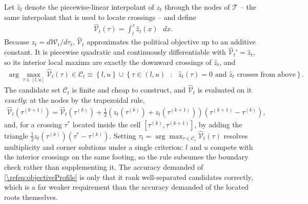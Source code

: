 \documentclass[a4paper]{article}
\begin{document}
Let $\hat{z}_t$ denote the piecewise-linear interpolant of $z_t$ through the nodes of $\mathcal{T}$ -- the same interpolant that is used to locate crossings -- and define
\begin{align}\label{\refeq:objectiveProfile}
    \hat{\mathcal{V}}_t(\tau) = \int_l^{\tau}\hat{z}_t(x)\mbox{ }dx.
\end{align}
Because $z_t = d\mathcal{W}_t/d\tau_t$, $\hat{\mathcal{V}}_t$ approximates the political objective up to an additive constant. It is piecewise quadratic and continuously differentiable with $\hat{\mathcal{V}}_t' = \hat{z}_t$, so its interior local maxima are exactly the downward crossings of $\hat{z}_t$, and
\begin{align}\label{\refeq:candidates}
    \arg\max_{\tau\in[l,u]}\hat{\mathcal{V}}_t(\tau)\in\mathcal{C}_t \equiv \left\lbrace l,u \right\rbrace\cup\left\lbrace \tau\in(l,u)\mbox{ }:\mbox{ }\hat{z}_t(\tau) = 0\text{ and }\hat{z}_t\text{ crosses from above}\right\rbrace.
\end{align}
The candidate set $\mathcal{C}_t$ is finite and cheap to construct, and $\hat{\mathcal{V}}_t$ is evaluated on it \emph{exactly}: at the nodes by the trapezoidal rule,
\begin{align*}
    \hat{\mathcal{V}}_t\left(\tau^{(k+1)}\right) = \hat{\mathcal{V}}_t\left(\tau^{(k)}\right)+\frac{1}{2}\left(z_t\left(\tau^{(k)}\right)+z_t\left(\tau^{(k+1)}\right)\right)\left(\tau^{(k+1)}-\tau^{(k)}\right),
\end{align*}
and, for a crossing $\tau^*$ located inside the cell $\left[\tau^{(k)},\tau^{(k+1)}\right]$, by adding the triangle $\frac{1}{2}z_t\left(\tau^{(k)}\right)\left(\tau^*-\tau^{(k)}\right)$. Setting $\tau_t = \arg\max_{\tau\in\mathcal{C}_t}\hat{\mathcal{V}}_t(\tau)$ resolves multiplicity and corner solutions under a single criterion: $l$ and $u$ compete with the interior crossings on the same footing, so the rule subsumes the boundary check rather than supplementing it. The accuracy demanded of \eqref{\refeq:objectiveProfile} is only that it rank well-separated candidates correctly, which is a far weaker requirement than the accuracy demanded of the located roots themselves.
\end{document}
